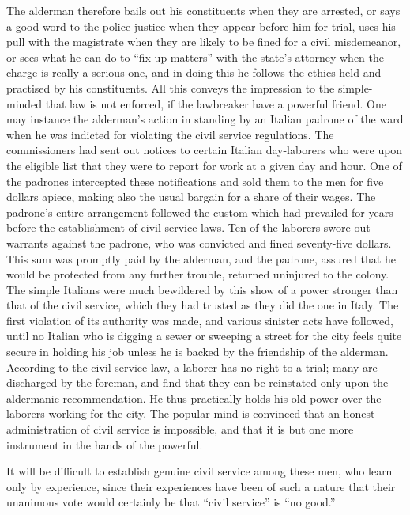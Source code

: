 \documentclass[]{article}
\begin{document}
\begin{sectionbody}
\addamsparagraph The alderman therefore bails out his constituents when they are
arrested, or says a good word to the police justice when they appear
before him for trial, uses his pull with the magistrate when they are
likely to be fined for a civil misdemeanor, or sees what he can do to
``fix up matters'' with the state's attorney when the charge is really a
serious one, and in doing this he follows the ethics held and practised
by his constituents. All this conveys the impression to the
simple-minded that law is not enforced, if the lawbreaker have a
powerful friend. One may instance the alderman's action in standing by
an Italian padrone of the ward when he was indicted for violating the
civil service regulations. The commissioners had sent out notices to
certain Italian day-laborers who were upon the eligible list that they
were to report for work at a given day and hour. One of the padrones
intercepted these notifications and sold them to the men for five
dollars apiece, making also the usual bargain for a share of their
wages. The padrone's entire arrangement followed the custom which had
prevailed for years before the establishment of civil service laws. Ten
of the laborers swore out warrants against the padrone, who was
convicted and fined seventy-five dollars. This sum was promptly paid by
the alderman, and the padrone, assured that he would be protected from
any further trouble, returned uninjured to the colony. The simple
Italians were much bewildered by this show of a power stronger than that
of the civil service, which they had trusted as they did the one in
Italy. The first violation of its authority was made, and various
sinister acts have followed, until no Italian who is digging a sewer or
sweeping a street for the city feels quite secure in holding his job
unless he is backed by the friendship of the alderman. According to the
civil service law, a laborer has no right to a trial; many are
discharged by the foreman, and find that they can be reinstated only
upon the aldermanic recommendation. He thus practically holds his old
power over the laborers working for the city. The popular mind is
convinced that an honest administration of civil service is impossible,
and that it is but one more instrument in the hands of the powerful.

\addamsparagraph It will be difficult to establish genuine civil service among these men,
who learn only by experience, since their experiences have been of such
a nature that their unanimous vote would certainly be that ``civil
service'' is ``no good.''


\end{sectionbody}
\end{document}
